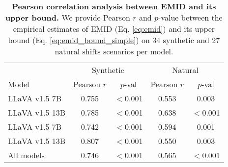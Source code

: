\begin{table}[!thb]
\vspace{-0.6em}
\caption{\textbf{Pearson correlation analysis between EMID and its upper bound.} We provide Pearson $r$ and $p$-value between the empirical estimates of EMID (Eq. \eqref{eq:emid}) and its upper bound (Eq. \eqref{eq:emid_bound_simple}) on 34 synthetic and 27 natural shifts scenarios per model. %
}
\centering
{\scriptsize
\begin{tabular}{@{}l|cccc@{}}
\toprule
               & \multicolumn{2}{c}{Synthetic} & \multicolumn{2}{c}{Natural}  \\ 
Model          & Pearson $r$  & $p$-val & Pearson $r$ & $p$-val \\ \midrule
LLaVA v1.5 7B  & 0.755      & $<$0.001 & 0.553     & 0.003            \\
LLaVA v1.5 13B & 0.785      & $<$0.001 & 0.638     & $<$0.001 \\
LLaVA v1.5 7B  & 0.742      & $<$0.001 & 0.594     & 0.001            \\
LLaVA v1.5 13B & 0.807      & $<$0.001 & 0.550     & 0.003            \\ \midrule
All models     & 0.746      & $<$0.001 & 0.565     & $<$0.001 \\ \bottomrule
\end{tabular} \label{tab:emid_ub_pearson}
}
\vspace{-0.6em}
\end{table}